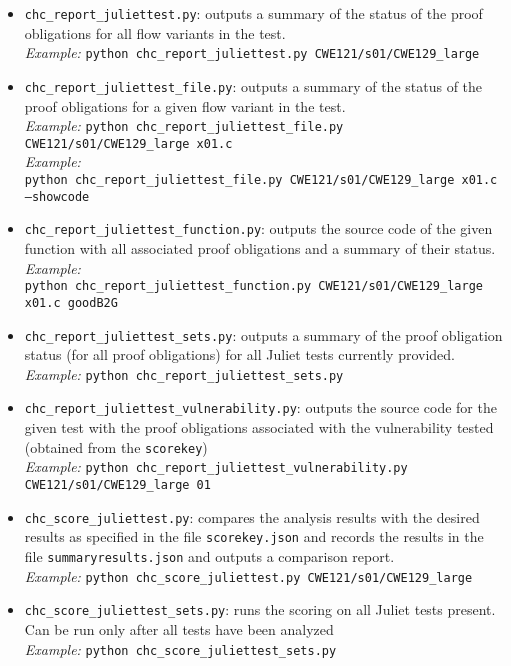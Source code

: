 \documentclass[11pt]{article}
\begin{document}
\begin{itemize}[leftmargin=*]
\item {\tt chc\_report\_juliettest.py}: outputs a summary of the status of the proof
   obligations for all flow variants in the test.\\
\emph{Example:} {\tt python chc\_report\_juliettest.py CWE121/s01/CWE129\_large}
\item {\tt chc\_report\_juliettest\_file.py}: outputs a summary of the status of the
   proof obligations for a given flow variant in the test. \\
\emph{Example:} {\tt python chc\_report\_juliettest\_file.py CWE121/s01/CWE129\_large x01.c}\\
\emph{Example:} \\
{\tt python chc\_report\_juliettest\_file.py CWE121/s01/CWE129\_large x01.c 
 --showcode}
\item {\tt chc\_report\_juliettest\_function.py}: outputs the source code of the given
   function with all associated proof obligations and a summary of their status.\\
\emph{Example:}\\
 {\tt python chc\_report\_juliettest\_function.py CWE121/s01/CWE129\_large x01.c goodB2G}
\item {\tt chc\_report\_juliettest\_sets.py}: outputs a summary of the proof obligation
  status (for all proof obligations) for all Juliet tests currently provided.\\
\emph{Example:} {\tt python chc\_report\_juliettest\_sets.py}
\item {\tt chc\_report\_juliettest\_vulnerability.py}: outputs the source code for the
  given test with the proof obligations associated with the vulnerability tested
  (obtained from the {\tt scorekey}) \\
\emph{Example:} {\tt python chc\_report\_juliettest\_vulnerability.py CWE121/s01/CWE129\_large 01}
\item {\tt chc\_score\_juliettest.py}: compares the analysis results with the desired results
   as specified in the file {\tt scorekey.json} and records the results in the file {\tt summaryresults.json} 
   and outputs a comparison report. \\
\emph{Example:} {\tt python chc\_score\_juliettest.py CWE121/s01/CWE129\_large}
\item {\tt chc\_score\_juliettest\_sets.py}: runs the scoring on all Juliet tests present.
Can be run only after all tests have been analyzed \\
\emph{Example:} {\tt python chc\_score\_juliettest\_sets.py}
\end{itemize}
\end{document}
